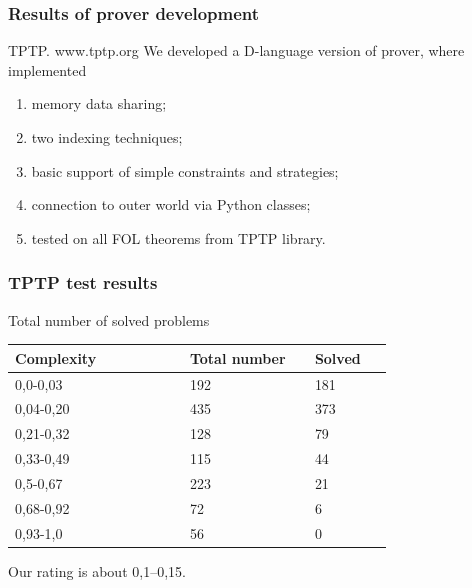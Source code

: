 \documentclass[aspectratio=169]{beamer}
\begin{document}
\begin{frame}
\frametitle{Results of prover development}
TPTP. www.tptp.org
We developed a D-language version of prover, where implemented
\begin{enumerate}
\item memory data sharing;
\item two indexing techniques;
\item basic support of simple constraints and strategies;
\item connection to outer world via Python classes;
\item tested on all FOL theorems from TPTP library.
\end{enumerate}
\end{frame}

\begin{frame}
\frametitle{TPTP test results}
\begin{block}{Total number of solved problems}
\begin{longtable}{|p{0.35\linewidth}|p{0.25\linewidth}|p{0.15\linewidth}|}
\hline
\textbf{Complexity} & \textbf{Total number} & \textbf{Solved} \\
\hline
\endhead
0,0-0,03 & 192 & 181 \\
\hline
0,04-0,20 & 435 & 373 \\
\hline
0,21-0,32 & 128 & 79 \\
\hline
0,33-0,49 & 115 & 44 \\
\hline
0,5-0,67 & 223 & 21 \\
\hline
0,68-0,92 & 72 & 6 \\
\hline
0,93-1,0 & 56 & 0\\
\hline
\end{longtable}
\end{block}
Our rating is about 0,1--0,15.
\end{frame}
\end{document}
